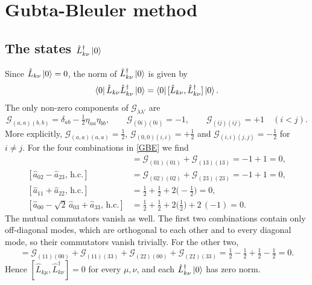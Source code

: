 \documentclass[12pt,a4paper,oneside]{article}
\numberwithin{equation}{section}   %
\begin{document}
\newpage
\section{Gubta-Bleuler method}
\subsection{The states $\hat L^\dagger_{k\nu}\ket{0}$}
\label{app:Lstates}

Since $\hat L_{k\nu}\ket0=0$, the norm of $\hat L^\dagger_{k\nu}\ket0$ is given by
\begin{equation}
  \bra0\hat L_{k\nu}\hat L^\dagger_{k\nu}\ket0
  =\bra0[\hat L_{k\nu},\hat L^\dagger_{k\nu}]\ket0 .
\end{equation}
The only non-zero components of $\mathcal G_{\lambda\lambda'}$ are
\begin{equation}
  \mathcal G_{(a,a)(b,b)}=\delta_{ab}-\tfrac12 \eta_{aa}\eta_{bb},\qquad
  \mathcal G_{(0i)(0i)}=-1,\qquad
  \mathcal G_{(ij)(ij)}=+1 \quad (i<j).
\end{equation}
More explicitly,
$\mathcal G_{(a,a)(a,a)}=\tfrac12$, $\mathcal G_{(0,0)(i,i)}=+\tfrac12$ and
$\mathcal G_{(i,i)(j,j)}=-\tfrac12$ for $i\neq j$.
For the four combinations in \eqref{GBE} we find
\begin{align}
  [\hat a_{01}-\hat a_{13},\,\text{h.c.}]
    &=\mathcal G_{(01)(01)}+\mathcal G_{(13)(13)}=-1+1=0,\\
  [\hat a_{02}-\hat a_{23},\,\text{h.c.}]
    &=\mathcal G_{(02)(02)}+\mathcal G_{(23)(23)}=-1+1=0,\\
  [\hat a_{11}+\hat a_{22},\,\text{h.c.}]
    &=\tfrac12+\tfrac12+2\bigl(-\tfrac12\bigr)=0,\\
  [\hat a_{00}-\sqrt2\,\hat a_{03}+\hat a_{33},\,\text{h.c.}]
    &=\tfrac12+\tfrac12+2\bigl(\tfrac12\bigr)+2\,(-1)=0 .
\end{align}
The mutual commutators vanish as well. The first two combinations contain only
off-diagonal modes, which are orthogonal to each other and to every diagonal
mode, so their commutators vanish trivially. For the other two,
\begin{equation}
  [\hat a_{11}+\hat a_{22},\,
   \hat a^\dagger_{00}-\sqrt2\,\hat a^\dagger_{03}+\hat a^\dagger_{33}]
  =\mathcal G_{(11)(00)}+\mathcal G_{(11)(33)}+\mathcal G_{(22)(00)}+\mathcal G_{(22)(33)}
  =\tfrac12-\tfrac12+\tfrac12-\tfrac12=0 .
\end{equation}
Hence $[\hat L_{k\mu},\hat L^\dagger_{k\nu}]=0$ for every $\mu,\nu$, and each
$\hat L^\dagger_{k\nu}\ket0$ has zero norm.
\end{document}
